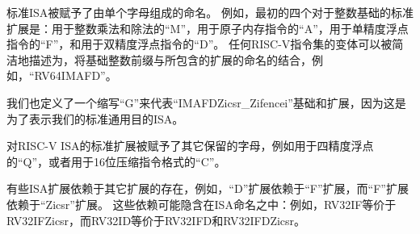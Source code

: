 标准ISA被赋予了由单个字母组成的命名。
例如，最初的四个对于整数基础的标准扩展是：用于整数乘法和除法的“M”，用于原子内存指令的“A”，用于单精度浮点指令的“F”，和用于双精度浮点指令的“D”。
任何RISC-V指令集的变体可以被简洁地描述为，将基础整数前缀与所包含的扩展的命名的结合，例如，“RV64IMAFD”。

我们也定义了一个缩写“G”来代表“IMAFDZicsr_Zifencei”基础和扩展，因为这是为了表示我们的标准通用目的ISA。

对RISC-V ISA的标准扩展被赋予了其它保留的字母，例如用于四精度浮点的“Q”，或者用于16位压缩指令格式的“C”。

有些ISA扩展依赖于其它扩展的存在，例如，“D”扩展依赖于“F”扩展，而“F”扩展依赖于“Zicsr”扩展。
这些依赖可能隐含在ISA命名之中：例如，RV32IF等价于RV32IFZicsr，而RV32ID等价于RV32IFD和RV32IFDZicsr。

